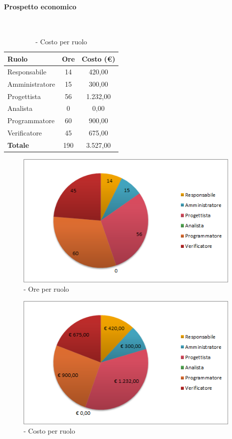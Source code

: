 \documentclass[../PianoDiProgetto.tex]{subfiles}
\begin{document}
	\paragraph{Prospetto economico}\
					
	\begin{table}[H]
		\centering
	
		\begin{tabular}{l * {2}{c}}
			\toprule
			\textbf{Ruolo} & \textbf{Ore} & \textbf{Costo (\euro{})} \\
			\midrule
			Responsabile & 14    &  420,00 \\
			Amministratore  & 15    &  300,00 \\
			Progettista  & 56   &  1.232,00 \\
			Analista & 0    &  0,00 \\
			Programmatore  & 60    &  900,00 \\
			Verificatore  & 45    &  675,00 \\
			\midrule
			\textbf{Totale}  & 190   &  3.527,00 \\
			\bottomrule
		\end{tabular}
		\caption{\PerC{} - Costo per ruolo}
	\end{table}

\vspace{35mm}
	
	\begin{figure}[H]
		\centering
		\includegraphics[width=11cm, trim=1cm 0cm 1cm 0cm]{grafici/C-ruolo}
			\caption{\PerC{} - Ore per ruolo}
	\end{figure}
\vfill
	\begin{figure}[H]
		\centering
		\includegraphics[width=11cm, trim=1cm 0cm 1cm 0cm]{grafici/C-costo}
			\caption{\PerC{} - Costo per ruolo}
	\end{figure}
	
\end{document}
